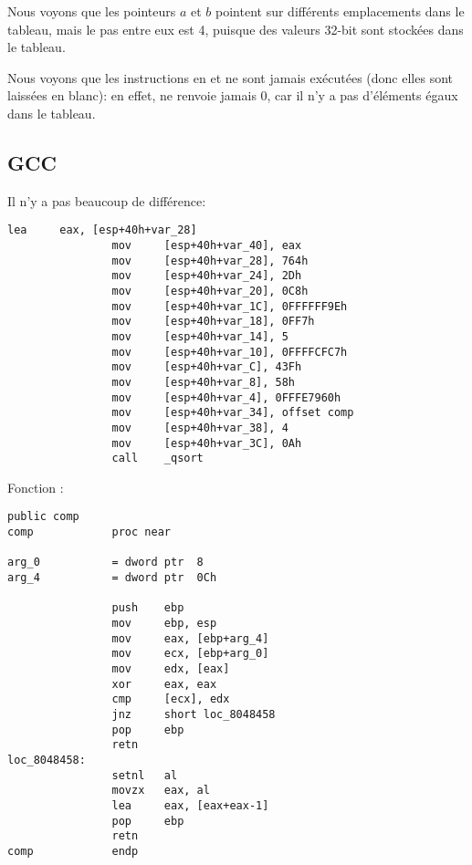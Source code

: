 Nous voyons que les pointeurs $a$ et $b$ pointent sur différents emplacements dans
le tableau, mais le pas entre eux est 4, puisque des valeurs 32-bit sont stockées
dans le tableau.

Nous voyons que les instructions en  et  ne sont jamais
exécutées (donc elles sont laissées en blanc): en effet, \comp ne renvoie jamais
0, car il n'y a pas d'éléments égaux dans le tableau.

\subsection{GCC}

Il n'y a pas beaucoup de différence:

\begin{lstlisting}[caption=GCC,style=customasmx86]
                lea     eax, [esp+40h+var_28]
                mov     [esp+40h+var_40], eax
                mov     [esp+40h+var_28], 764h
                mov     [esp+40h+var_24], 2Dh
                mov     [esp+40h+var_20], 0C8h
                mov     [esp+40h+var_1C], 0FFFFFF9Eh
                mov     [esp+40h+var_18], 0FF7h
                mov     [esp+40h+var_14], 5
                mov     [esp+40h+var_10], 0FFFFCFC7h
                mov     [esp+40h+var_C], 43Fh
                mov     [esp+40h+var_8], 58h
                mov     [esp+40h+var_4], 0FFFE7960h
                mov     [esp+40h+var_34], offset comp
                mov     [esp+40h+var_38], 4
                mov     [esp+40h+var_3C], 0Ah
                call    _qsort
\end{lstlisting}

Fonction \comp:

\begin{lstlisting}[style=customasmx86]
                public comp
comp            proc near

arg_0           = dword ptr  8
arg_4           = dword ptr  0Ch

                push    ebp
                mov     ebp, esp
                mov     eax, [ebp+arg_4]
                mov     ecx, [ebp+arg_0]
                mov     edx, [eax]
                xor     eax, eax
                cmp     [ecx], edx
                jnz     short loc_8048458
                pop     ebp
                retn
loc_8048458:
                setnl   al
                movzx   eax, al
                lea     eax, [eax+eax-1]
                pop     ebp
                retn
comp            endp
\end{lstlisting}

